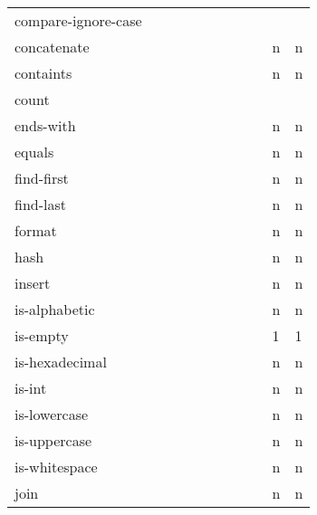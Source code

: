 \documentclass[anonymous,sigplan,review,11pt,nonacm,natbib=false]{acmart}
\begin{document}
\begin{table*}
\begin{tabular}{lllllllllll}
            compare-ignore-case &  &  &  &  &  & &  &  &  & \\

            concatenate &  &  &  &  &  & &  &  & n & n \\

            containts &  &  &  &  &  & &  &  & n & n \\

            count &  &  &  &  &  & &  &  &  & \\

            ends-with &  &  &  &  &  & &  &  & n & n \\

            equals &  &  &  &  &  & &  &  & n & n \\

            find-first &  &  &  &  &  & &  &  & n & n \\

            find-last &  &  &  &  &  & &  &  & n & n \\

            format &  &  &  &  &  & &  &  & n & n \\

            hash &  &  &  &  &  & &  &  & n & n \\

            insert &  &  &  &  &  & &  &  & n & n \\

            is-alphabetic &  &  &  &  &  & &  &  & n & n \\

            is-empty &  &  &  &  &  & &  &  & 1 & 1 \\

            is-hexadecimal &  &  &  &  &  & &  &  & n & n \\

            is-int &  &  &  &  &  & &  &  & n & n \\

            is-lowercase &  &  &  &  &  & &  &  & n & n \\

            is-uppercase &  &  &  &  &  & &  &  & n & n \\

            is-whitespace &  &  &  &  &  & &  &  & n & n \\

            join &  &  &  &  &  & &  &  & n & n \\


\end{tabular}
\end{table*}
\end{document}
